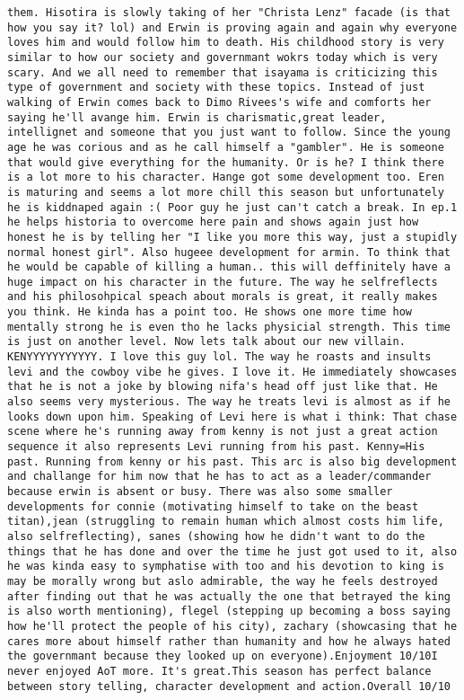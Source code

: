 \documentclass[
]{article}
\begin{document}
\begin{verbatim}
them. Hisotira is slowly taking of her "Christa Lenz" facade (is that how you say it? lol) and Erwin is proving again and again why everyone loves him and would follow him to death. His childhood story is very similar to how our society and governmant wokrs today which is very scary. And we all need to remember that isayama is criticizing this type of government and society with these topics. Instead of just walking of Erwin comes back to Dimo Rivees's wife and comforts her saying he'll avange him. Erwin is charismatic,great leader, intellignet and someone that you just want to follow. Since the young age he was corious and as he call himself a "gambler". He is someone that would give everything for the humanity. Or is he? I think there is a lot more to his character. Hange got some development too. Eren is maturing and seems a lot more chill this season but unfortunately he is kiddnaped again :( Poor guy he just can't catch a break. In ep.1 he helps historia to overcome here pain and shows again just how honest he is by telling her "I like you more this way, just a stupidly normal honest girl". Also hugeee development for armin. To think that he would be capable of killing a human.. this will deffinitely have a huge impact on his character in the future. The way he selfreflects and his philosohpical speach about morals is great, it really makes you think. He kinda has a point too. He shows one more time how mentally strong he is even tho he lacks physicial strength. This time is just on another level. Now lets talk about our new villain. KENYYYYYYYYYYY. I love this guy lol. The way he roasts and insults levi and the cowboy vibe he gives. I love it. He immediately showcases that he is not a joke by blowing nifa's head off just like that. He also seems very mysterious. The way he treats levi is almost as if he looks down upon him. Speaking of Levi here is what i think: That chase scene where he's running away from kenny is not just a great action sequence it also represents Levi running from his past. Kenny=His past. Running from kenny or his past. This arc is also big development and challange for him now that he has to act as a leader/commander because erwin is absent or busy. There was also some smaller developments for connie (motivating himself to take on the beast titan),jean (struggling to remain human which almost costs him life, also selfreflecting), sanes (showing how he didn't want to do the things that he has done and over the time he just got used to it, also he was kinda easy to symphatise with too and his devotion to king is may be morally wrong but aslo admirable, the way he feels destroyed after finding out that he was actually the one that betrayed the king is also worth mentioning), flegel (stepping up becoming a boss saying how he'll protect the people of his city), zachary (showcasing that he cares more about himself rather than humanity and how he always hated the governmant because they looked up on everyone).Enjoyment 10/10I never enjoyed AoT more. It's great.This season has perfect balance between story telling, character development and action.Overall 10/10

\end{verbatim}
\end{document}
